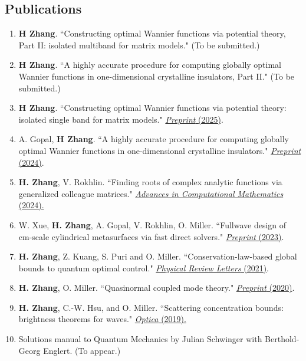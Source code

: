 \documentclass[margin,line,pifont,palatino,courier]{res}
\begin{document}
\begin{resume}
\section{\sc Publications}
\begin{enumerate}
\setlength\itemsep{0em}
	\item{\textbf{H Zhang}. ``Constructing optimal Wannier functions via potential theory,\\ Part II: isolated multiband for matrix models." (To be submitted.) }
	\item{ \textbf{H Zhang}. ``A highly accurate procedure for computing globally optimal Wannier functions in one-dimensional crystalline insulators, Part II." (To be submitted.) }
	\item{\textbf{H Zhang}. ``Constructing optimal Wannier functions via potential theory: isolated single band for matrix models." \href{https://arxiv.org/abs/2502.08641}{\color{blue} \emph{Preprint} (2025)}.}
	\item{A. Gopal, \textbf{H Zhang}. ``A highly accurate procedure for computing globally optimal Wannier functions in one-dimensional crystalline insulators." \href{https://arxiv.org/abs/2409.04369}{\color{blue} \emph{Preprint} (2024)}.}
	\item \textbf{H. Zhang}, V. Rokhlin. ``Finding roots of complex analytic functions via generalized colleague matrices." \href{https://link.springer.com/article/10.1007/s10444-024-10174-z}{\color{blue}  \emph{Advances in Computational Mathematics} (2024).}
	\item W. Xue, \textbf{H. Zhang}, A. Gopal, V. Rokhlin, O. Miller. ``Fullwave design of cm-scale cylindrical metasurfaces via fast direct solvers." \href{https://arxiv.org/abs/2308.08569}{\color{blue} \emph{Preprint} (2023)}.
	\item{\textbf{H. Zhang}, Z. Kuang, S. Puri and O. Miller. ``Conservation-law-based global bounds to quantum optimal control." \href{https://journals.aps.org/prl/abstract/10.1103/PhysRevLett.127.110506}{\color{blue} \emph{Physical Review Letters} (2021)}.}
	\item{\textbf{H. Zhang}, O. Miller. ``Quasinormal coupled mode theory." \href{https://arxiv.org/abs/2010.08650}{\color{blue} \emph{Preprint} (2020)}.}
	\item{\textbf{H. Zhang}, C.-W. Hsu, and O. Miller. ``Scattering concentration bounds: brightness theorems for waves." \href{https://doi.org/10.1364/OPTICA.6.001321}{\color{blue} \emph{Optica} (2019).}}
	\item{Solutions manual to Quantum Mechanics by Julian Schwinger with Berthold-Georg Englert. (To appear.)}
\end{enumerate}


\end{resume}
\end{document}
